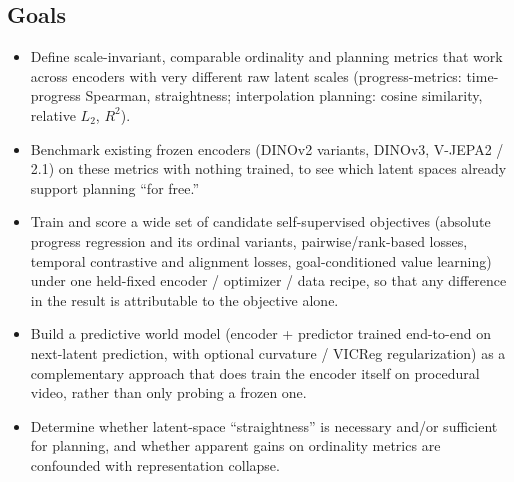 \subsection{Goals}
\begin{itemize}
    \item Define scale-invariant, comparable ordinality and planning metrics that work
    across encoders with very different raw latent scales (progress-metrics:
    time-progress Spearman, straightness; interpolation planning: cosine similarity,
    relative $L_2$, $R^2$).
    \item Benchmark existing frozen encoders (DINOv2 variants, DINOv3, V-JEPA2 / 2.1) on
    these metrics with nothing trained, to see which latent spaces already support
    planning ``for free.''
    \item Train and score a wide set of candidate self-supervised objectives (absolute
    progress regression and its ordinal variants, pairwise/rank-based losses, temporal
    contrastive and alignment losses, goal-conditioned value learning) under one
    held-fixed encoder / optimizer / data recipe, so that any difference in the result is
    attributable to the objective alone.
    \item Build a predictive world model (encoder + predictor trained end-to-end on
    next-latent prediction, with optional curvature / VICReg regularization) as a
    complementary approach that does train the encoder itself on procedural video, rather
    than only probing a frozen one.
    \item Determine whether latent-space ``straightness'' is necessary and/or sufficient
    for planning, and whether apparent gains on ordinality metrics are confounded with
    representation collapse.
\end{itemize}

